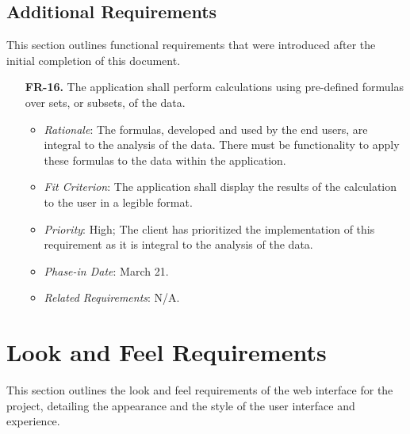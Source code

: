 \documentclass[12pt]{article}
\begin{document}
\subsection{Additional Requirements}
This section outlines functional requirements that were introduced after the
initial completion of this document.
\begin{enumerate}
  \item[\textbf{FR-16.}] The application shall perform calculations using
  pre-defined formulas over sets, or subsets, of the data.
  \begin{itemize}
    \item \textit{Rationale}: The formulas, developed and used by the end users,
    are integral to the analysis of the data. There must be functionality to
    apply these formulas to the data within the application.
    \item \textit{Fit Criterion}: The application shall display the results of
    the calculation to the user in a legible format.
    \item \textit{Priority}: High; The client has prioritized the implementation
    of this requirement as it is integral to the analysis of the data.
    \item \textit{Phase-in Date}: March 21. 
    \item \textit{Related Requirements}: N/A.
  \end{itemize}
\end{enumerate}

\section{Look and Feel Requirements}
This section outlines the look and feel requirements of the web interface for the
project, detailing the appearance and the style of the user interface and
experience.
\end{document}
